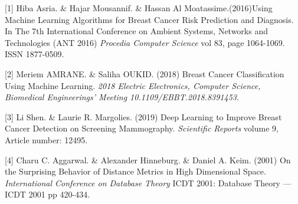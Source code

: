 \documentclass{article} %
\begin{document}
\small{

[1] Hiba Asria. \& Hajar Mousannif. \& Hassan Al Moatassime.(2016)Using Machine Learning Algorithms for Breast Cancer Risk Prediction and Diagnosis. In The 7th International Conference on Ambient Systems, Networks and Technologies (ANT 2016) {\it Procedia Computer Science} vol 83, page 1064-1069. ISSN 1877-0509.


[2] Meriem AMRANE. \& Saliha OUKID. (2018) Breast Cancer Classification Using Machine Learning. {\it 2018 Electric Electronics, Computer Science, Biomedical Engineerings' Meeting 10.1109/EBBT.2018.8391453}.

[3] Li Shen. \& Laurie R. Margolies. (2019) Deep Learning to Improve Breast
Cancer Detection on Screening Mammography. {\it Scientific Reports} volume 9, Article number: 12495.

[4] Charu C. Aggarwal. \& Alexander Hinneburg. \& Daniel A. Keim. (2001) On the Surprising Behavior of Distance Metrics in High Dimensional Space. {\it International Conference on Database Theory} ICDT 2001: Database Theory — ICDT 2001 pp 420-434.
}
\end{document}
